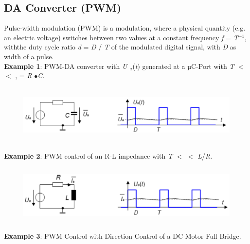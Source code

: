 \subsection{DA Converter (PWM)}

Pulse-width modulation (PWM) is a modulation, where a physical quantity (e.g. an electric voltage) switches between two values at a constant frequency \textit{f}  = \textit{T}${}^{-1}$, withthe duty cycle ratio \textit{d} = \textit{D} / \textit{T} of the modulated digital signal, with \textit{D} as width of a pulse.\\

\textbf{Example 1}:  PWM-DA converter with \textit{U ${}_{a}$}(\textit{t}) generated at a µC-Port with \textit{T} $\mathrm{<}$ $\mathrm{<}$ ,  = \textit{R} $\mathrm{\bullet}$\textit{C}.

    \begin{figure}[h]
    \centering
    \includegraphics[width=12cm, height=3cm]{Images/image167.png}
    \label{fig:Fig }
    \end{figure}

\textbf{Example 2}:  PWM control of an R-L impedance with \textit{T} $\mathrm{<}$ $\mathrm{<}$ \textit{L}/\textit{R}.

    \begin{figure}[h]
    \centering
    \includegraphics[width=12cm, height=3cm]{Images/image168.png}
    \label{fig:Fig }
    \end{figure}

\textbf{Example 3}:  PWM Control with Direction Control of a DC-Motor  Full Bridge.

